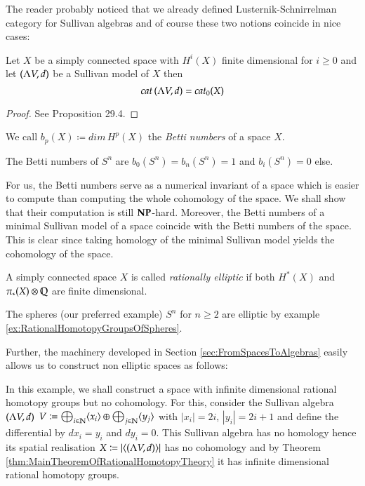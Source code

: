 The reader probably noticed that we already defined Lusternik-Schnirrelman category for Sullivan algebras and
of course these two notions coincide in nice cases:

\begin{Proposition}
 Let $X$ be a simply connected space with $H^i(X)$ finite dimensional for $i \geq 0$ and let $(\Lambda V,d)$ be 
 a Sullivan model of $X$ then
 $$ cat \, (\Lambda V,d) = cat_0 (X)$$
\end{Proposition}

\begin{proof}
 See \cite{Felix2001} Proposition 29.4.
\end{proof}

\begin{Definition}
 We call $b_p (X) \coloneqq dim \, H^p(X)$ the \emph{Betti numbers} of a space $X$.
\end{Definition}

\begin{Example}
 The Betti numbers of $S^n$ are $b_0(S^n) = b_n(S^n) = 1$ and $ b_i(S^n) = 0$ else.
\end{Example}

For us, the Betti numbers serve as a numerical invariant of a space which is easier to compute than computing the whole cohomology
of the space. We shall show that their computation is still $\mathbf{NP}$-hard. Moreover, the Betti numbers
of a minimal Sullivan model of a space coincide with the Betti numbers of the space. This is clear since taking 
homology of the minimal Sullivan model yields the cohomology of the space.

\begin{Definition}
 A simply connected space $X$ is called \emph{rationally elliptic} if both $H^*(X)$ and $\pi_*(X) \otimes \mathbb{Q}$ are finite dimensional.
\end{Definition}

\begin{Example}
 The spheres (our preferred example) $S^n$ for $n \geq 2$ are elliptic by example \ref{ex:RationalHomotopyGroupsOfSpheres}.
\end{Example}

Further, the machinery developed in Section \ref{sec:FromSpacesToAlgebras} easily allows us to construct non elliptic spaces 
as follows:
 \begin{Example}
  In this example, we shall construct a space with infinite dimensional rational homotopy groups but no cohomology.
  For this, consider the Sullivan algebra $(\Lambda V,d)$
  ${V \coloneqq \bigoplus_{i \in \mathbb{N}} \langle x_i \rangle \oplus \bigoplus_{j \in \mathbb{N}} \langle y_j \rangle}$ with
  $|x_i| = 2i$, $|y_i| = 2i + 1$ and define the differential by $dx_i = y_i$ and $dy_i = 0$. This Sullivan algebra
  has no homology hence its spatial realisation $ X \coloneqq | \langle (\Lambda V,d) \rangle |$ has no cohomology and
  by Theorem \ref{thm:MainTheoremOfRationalHomotopyTheory} it has infinite dimensional rational homotopy groups.
 \end{Example}
 
